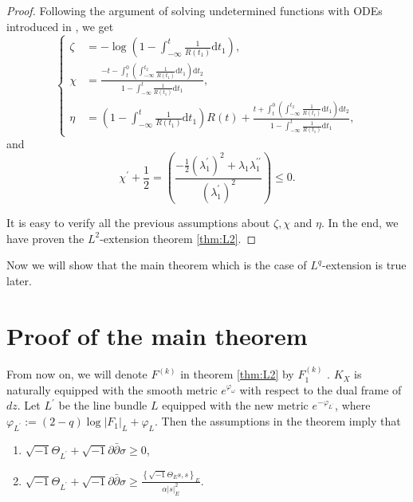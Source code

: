 \documentclass[lang=en,12pt,twoside]{textbook}
\begin{document}
\begin{proof}
Following the argument of solving undetermined functions with ODEs introduced in \cite[Section 4, pp. 151-153]{ZZ18}, we get
$$
\left\{
\begin{aligned}
\zeta &=-\log \left(1-\int_{-\infty}^t \frac{1}{R\left( t_1\right)} \mathrm{d} t_1\right), \\
\chi &=\frac{- t- \int_t^0\left(\int_{-\infty}^{t_2} \frac{1}{R\left( t_1\right)} \mathrm{d} t_1\right) \mathrm{d} t_2}{1-\int_{-\infty}^t \frac{1}{R\left( t_1\right)} \mathrm{d} t_1}, \\
\eta &=\left(1- \int_{-\infty}^t \frac{1}{R\left( t_1\right)} \mathrm{d} t_1\right) R( t)+\frac{ t+\int_t^0\left(\int_{-\infty}^{t_2} \frac{1}{R\left( t_1\right)} \mathrm{d} t_1\right) \mathrm{d} t_2}{1- \int_{-\infty}^t \frac{1}{R\left( t_1\right)} \mathrm{d} t_1},
\end{aligned}\right.
$$
and
$$
\chi^{\prime}+\frac{1}{2}=\left(\frac{-\frac{1}{2}\left(\lambda_1^{\prime}\right)^2+\lambda_1 \lambda_1^{\prime \prime}}{\left(\lambda_1^{\prime}\right)^2}\right) \leq 0 .
$$

It is easy to verify all the previous assumptions about $\zeta, \chi$ and $\eta$.
In the end, we have proven the $L^2$-extension  theorem \ref{thm:L2}.
\end{proof}

Now we will show that the main theorem which is the case of $L^q$-extension is true later.

\section{Proof of the main theorem}
From now on, we will denote $F^{(k)}$ in theorem \ref{thm:L2} by $F_1^{(k)}$ .
$K_X$ is naturally equipped with the smooth metric $e^{\varphi_\omega}$ with respect to the dual frame of $d z$. Let $L^{\prime}$ be the line bundle $L$ equipped with the new metric $e^{-\varphi_{L^{\prime}}}$, where $\varphi_{L^{\prime}}:=(2-q) \log \left|F_1\right|_L+\varphi_L$. Then the assumptions in the theorem imply that
\begin{enumerate}[label=(\roman*)]
  \item $\sqrt{-1} \Theta_{L^{\prime}}+\sqrt{-1} \partial \bar{\partial} \sigma \geq 0$,
  \item $\sqrt{-1} \Theta_{L^{\prime}}+\sqrt{-1} \partial \bar{\partial} \sigma \geq \frac{\left\{\sqrt{-1} \Theta_E s, s\right\}_E}{\alpha|s|_E^2}$.
\end{enumerate}
\end{document}
